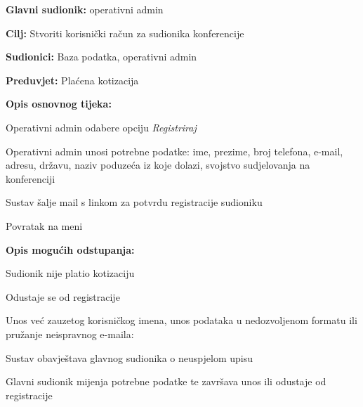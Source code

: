       \noindent {}
					\begin{packed_item}
	
						\item \textbf{Glavni sudionik: }operativni admin
						\item  \textbf{Cilj:} Stvoriti korisnički račun za  sudionika konferencije
						\item  \textbf{Sudionici:} Baza podatka, operativni admin
						\item  \textbf{Preduvjet:} Plaćena kotizacija
						\item  \textbf{Opis osnovnog tijeka:}
						
						\item[] \begin{packed_enum}

							\item Operativni admin odabere opciju \textit{Registriraj}
							\item Operativni admin unosi potrebne podatke: ime, prezime, broj telefona, e-mail, adresu, državu, naziv poduzeća iz koje dolazi, svojstvo sudjelovanja na konferenciji
                                \item Sustav šalje mail s linkom za potvrdu registracije sudioniku
                                \item Povratak na meni
						
						\end{packed_enum}
						\item  \textbf{Opis mogućih odstupanja:}
						
						\item[] \begin{packed_item}

                                \item[1.]  Sudionik nije platio kotizaciju
							\item[] \begin{packed_enum}
								
								\item Odustaje se od registracije

                                    \item[2.]  Unos već zauzetog korisničkog imena, unos podataka u nedozvoljenom       formatu ili pružanje neispravnog e-maila:
							\item[] \begin{packed_enum}
								
								\item Sustav obavještava glavnog sudionika o neuspjelom upisu
								\item Glavni sudionik mijenja potrebne podatke te završava unos ili odustaje od registracije
							
						\end{packed_enum}
                    \end{packed_enum}
					\end{packed_item}
     \end{packed_item}

